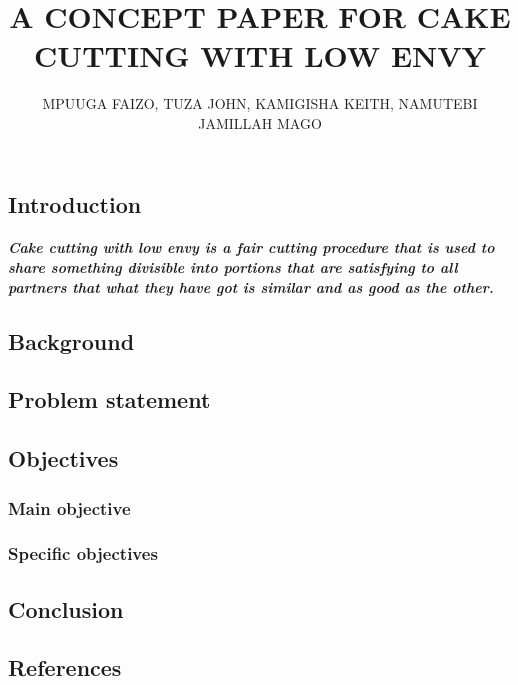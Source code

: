 \documentclass[12pt]{report}
\title{\textbf{A CONCEPT PAPER FOR CAKE CUTTING WITH LOW ENVY}}
\author{	MPUUGA FAIZO, TUZA JOHN, KAMIGISHA KEITH, NAMUTEBI JAMILLAH MAGO}
\begin{document}
\maketitle
\chapter{}
\section{Introduction} 
\paragraph{Cake cutting with low envy is a fair cutting procedure that is used to share something divisible into portions that are satisfying to all partners that what they have got is similar and as good as the other. }


\section{Background}
\section{Problem statement}
\section{Objectives}
\subsection{Main objective}
\subsection{Specific objectives}
\section{Conclusion}
\section{References}
\end{document}
